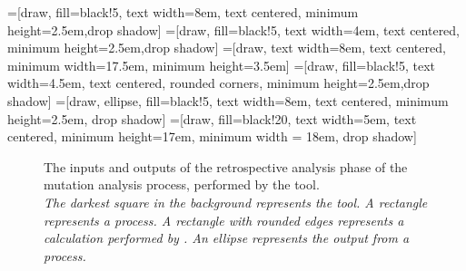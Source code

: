 \newcommand{\mx}[1]{\mathbf{\bm{#1}}} %
\newcommand{\vc}[1]{\mathbf{\bm{#1}}} %



=[draw, fill=black!5, text width=8em,
    text centered, minimum height=2.5em,drop shadow]
=[draw, fill=black!5, text width=4em,
    text centered, minimum height=2.5em,drop shadow]
=[draw, text width=8em,
    text centered, minimum width=17.5em, minimum height=3.5em]
=[draw, fill=black!5, text width=4.5em,
    text centered, rounded corners, minimum height=2.5em,drop shadow]
=[draw, ellipse, fill=black!5, text width=8em,
    text centered, minimum height=2.5em, drop shadow]
=[draw, fill=black!20, text width=5em,
    text centered, minimum height=17em, minimum width = 18em, drop shadow]

\def\blockdist{1.5}
\def\edgedist{2.5}

\begin{figure}[t]
  \centering
\caption{\label{fig:mrstudyr}The inputs and outputs of the retrospective analysis phase
of the mutation analysis process, performed by the \mr tool. \\
\textit{The darkest square in the background represents the \mr tool.
A rectangle represents a process. A rectangle with rounded edges represents a
calculation performed by \mr. An ellipse represents the output from a process.}}
\end{figure}
